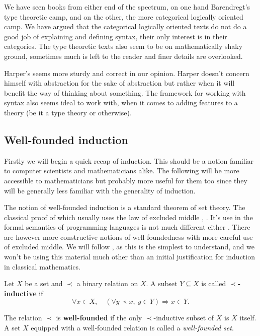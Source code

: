 We have seen books from either end of the spectrum, on one hand Barendregt's type theoretic camp, and on the other, the more categorical logically oriented camp. We have argued that the categorical logically oriented texts do not do a good job of explaining and defining syntax, their only interest is in their categories. The type theoretic texts also seem to be on mathematically shaky ground, sometimes much is left to the reader and finer details are overlooked.

Harper's seems more sturdy and correct in our opinion. Harper doesn't concern himself with abstraction for the sake of abstraction but rather when it will benefit the way of thinking about something. The framework for working with syntax also seems ideal to work with, when it comes to adding features to a theory (be it a type theory or otherwise).

\subsection{Well-founded induction}

Firstly we will begin a quick recap of induction. This should be a notion familiar to computer scientists and mathematicians alike. The following will be more accessible to mathematicians but probably more useful for them too since they will be generally less familiar with the generality of induction.


The notion of well-founded induction is a standard theorem of set theory. The classical proof of which usually uses the law of excluded middle \cite[p. 62]{johnstone1987notes}, \cite[Ch. 7]{barwise1982handbook}. It's use in the formal semantics of programming languages is not much different either \cite[Ch. 3]{winskel1993formal}. There are however more constructive notions of well-foundedness \cite[\S 8]{2018arXiv180805204S} with more careful use of excluded middle. We will follow \cite{10.2307/2275781}, as this is the simplest to understand, and we won't be using this material much other than an initial justification for induction in classical mathematics.

\begin{defin}
    Let $X$ be a set and $\prec$ a binary relation on $X$. A subset $Y \subseteq X$ is called \textbf{$\prec$-inductive} if
    $$
        \forall x \in X, \quad (\forall y \prec x,\ y \in Y) \Rightarrow x \in Y.
    $$
\end{defin}

\begin{defin}\label{wf}
    The relation $\prec$ is \textbf{well-founded} if the only $\prec$-inductive subset of $X$ is $X$ itself. A set $X$ equipped with a well-founded relation is called a \textit{well-founded set}.
\end{defin}

